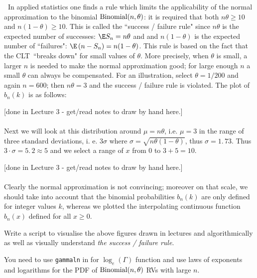 \textbf{\ }In applied statistics one finds a rule which limits the
applicability of the normal approximation to the binomial $\mbox{{\rm Binomial}}(n,\theta)$: it is
required that both $n\theta\geq 10$ and $n(1-\theta)\geq 10$. This is called the
``success / failure rule"  since $n\theta$ is the expected number of successes: $%
\E S_{n}=n\theta$ and and $n(1-\theta)$ is the expected number of ``failures": $\E\left(
n-S_{n}\right) =n(1-\theta)$. This rule is based on the fact that the CLT\
``breaks down" for small values of $\theta$. More precisely, when $\theta$ is small, a
larger $n$ is needed to make the normal approximation good; for large enough 
$n$ a small $\theta$ can always be compensated. For an illustration, select $%
\theta=1/200$ and again $n=600$; then $n\theta=3$ and the success / failure rule is
violated. The plot of $b_{n}(k)$ is as follows:


{\scriptsize [done in Lecture 3 - get/read notes to draw by hand here.]}\\
\vspace{3cm} 
~\\


Next we will look at this distribution around $\mu =n\theta$, i.e. $%
\mu =3$ in the range of three standard deviations, i. e. $3\sigma $ where $%
\sigma =\sqrt{n\theta(1-\theta)}$, thus $\sigma =1.\,73$. Thus $3\cdot \sigma
=5.\,2\approx 5$ and we select a range of $x$ from $0$ to $3+5=10$. 


{\scriptsize [done in Lecture 3 - get/read notes to draw by hand here.]}\\
\vspace{3cm} 
~\\


Clearly the normal
approximation is not convincing; moreover on that scale, we should take into
account that the binomial probabilities $b_{n}(k)$ are only defined for
integer values $k$, whereas we plotted the interpolating continuous function 
$b_{n}(x)$ defined for all $x\geq 0$.

\begin{labwork}\label{LW:VisualiseSuccessFailureRule}
Write a \Matlab script to visualise the above figures drawn in lectures and algorithmically as well as visually understand {\em the success / failure rule}.

You need to use {\tt gammaln} in \Matlab for $\log_e(\Gamma)$ function and use laws of exponents and logarithms for the PDF of $\mbox{{\rm Binomial}}(n,\theta)$ RVs with large $n$.
\end{labwork}

